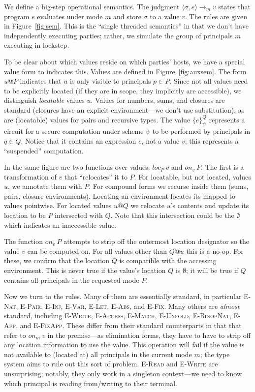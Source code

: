 \documentclass[10pt]{article}
\makeatletter
\newcommand{\rulelab}[1]{{\small \textsc{#1}}}
\newcommand{\kw}[1]{\ensuremath{\mathtt{#1}}}
\newcommand{\vshare}[3]{\ensuremath{\{{#3}\}^{#1}_{#2}}}
\newcommand{\vloc}[2]{\ensuremath{{#1}\kw{@}{#2}}}
\newcommand{\eval}[4]{\ensuremath{\config{#1}{#3} \longrightarrow_{#2} {#4}}}
\newcommand{\env}{\ensuremath{\sigma}}
\newcommand{\config}[2]{\ensuremath{\langle{#1},{#2}\rangle}}
\newcommand{\locof}[2]{\ensuremath{\mathit{loc}_{#1}~{#2}}}
\newcommand{\getat}[2]{\ensuremath{\mathit{on}_{#1}~{#2}}}
\makeatother
\begin{document}
We define a big-step operational semantics. The judgment
$\eval{\env}{m}{e}{v}$ states that program
$e$ evaluates under mode $m$ and store $\env$ to a value
$v$. The rules are given in Figure~\ref{fig:sem}.  This is the
``single threaded semantics'' in that we don't have independently
executing parties; rather, we simulate the group of principals
$m$ executing in lockstep.

To be clear about which values reside on which parties' hosts, we have
a special value form to indicates this. Values are defined in
Figure~\ref{fig:auxsem}. The form $\vloc{u}{P}$ indicates that $u$ is
only visible to principals $p \in P$. Since not all values need to
be explicitly located (if they are in scope, they implicitly
are accessible), we distinguish \emph{locatable} values $u$.
Values for numbers, sums, and closures are standard (closures
have an explicit environment---we don't use substitution), as are
(locatable) values for pairs and recursive types. The value
$\vshare{Q}{\psi}{e}$ represents a circuit for a secure computation
under scheme $\psi$ to be performed by principals in $q \in Q$. Notice
that it contains an expression $e$, not a value $v$; this represents a
``suspended'' computation. 

In the same figure are two functions over values: $\locof{P}{v}$ and
$\getat{v}{P}$. The first is a transformation of $v$ that
``relocates'' it to $P$. For locatable, but not located, values $u$,
we annotate them with $P$. For compound forms we recurse inside them
(sums, pairs, closure environments). Locating an environment locates
its mapped-to values pointwise.  For located values $\vloc{u}{Q}$ we
relocate $u$'s contents and update its location to be $P$ intersected
with $Q$. Note that this intersection could be the $\emptyset$ which
indicates an inaccessible value.

The function $\getat{v}{P}$ attempts to strip off the outermost
location designator so the value $v$ can be computed on. For all
values other than $\vloc{Q}{u}$ this is a no-op. For these, we confirm
that the location $Q$ is compatible with the accessing
environment. This is never true if the value's location $Q$ is
$\emptyset$; it will be true if $Q$ contains all principals in the
requested mode $P$.

Now we turn to the rules. Many of them are essentially standard, in
particular \rulelab{E-Nat}, \rulelab{E-Pair}, \rulelab{E-Inj},
\rulelab{E-Var}, \rulelab{E-Let}, \rulelab{E-Abs}, and \rulelab{E-Fix}. Many others are
\emph{almost} standard, including \rulelab{E-Write}, \rulelab{E-Access},
\rulelab{E-Match}, \rulelab{E-Unfold}, \rulelab{E-BinopNat}, 
\rulelab{E-App}, and \rulelab{E-FixApp}. These differ from their
standard counterparts in that 
that refer to $\getat{m}{v}$ in the premise---as elimination forms,
they have to have to strip off any location information to use the
value. This operation will fail if the value is not available to
(located at) all principals in the current mode $m$; the type system
aims to rule out this sort of problem. \rulelab{E-Read} and
\rulelab{E-Write} are unsurprising; notably, they only work in a
singleton context---we need to know 
which principal is reading from/writing to their terminal. 
\end{document}
